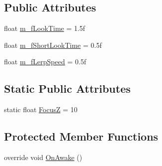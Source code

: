 \subsection*{Public Attributes}
\begin{DoxyCompactItemize}
\item 
float \mbox{\hyperlink{class_e_w_eye_tracking_a30bedfa38908a52193c7c6ce130461ea}{m\+\_\+f\+Look\+Time}} = 1.\+5f
\item 
float \mbox{\hyperlink{class_e_w_eye_tracking_a47a37230c6b770672d0525c9ce03f968}{m\+\_\+f\+Short\+Look\+Time}} = 0.\+5f
\item 
float \mbox{\hyperlink{class_e_w_eye_tracking_aa8454c8a2216b073f86f50e0c2f80400}{m\+\_\+f\+Lerp\+Speed}} = 0.\+5f
\end{DoxyCompactItemize}
\subsection*{Static Public Attributes}
\begin{DoxyCompactItemize}
\item 
static float \mbox{\hyperlink{class_e_w_eye_tracking_ae2b04e1a210ad9de92b0ac4d4292e19b}{FocusZ}} = 10
\end{DoxyCompactItemize}
\subsection*{Protected Member Functions}
\begin{DoxyCompactItemize}
\item 
override void \mbox{\hyperlink{class_e_w_eye_tracking_a0f2a94f353f615f9c10721fd2641bdb6}{On\+Awake}} ()
\end{DoxyCompactItemize}
